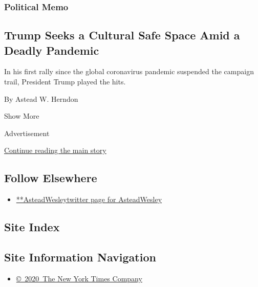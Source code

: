 \begin{enumerate}
  \hypertarget{political-memo}{%
  \subsubsection{Political Memo}\label{political-memo}}

  \hypertarget{trump-seeks-a-cultural-safe-space-amid-a-deadly-pandemic}{%
  \subsection{Trump Seeks a Cultural Safe Space Amid a Deadly
  Pandemic}\label{trump-seeks-a-cultural-safe-space-amid-a-deadly-pandemic}}

  In his first rally since the global coronavirus pandemic suspended the
  campaign trail, President Trump played the hits.

  By Astead W. Herndon
\end{enumerate}

Show More

Advertisement

\protect\hyperlink{after-mid2}{Continue reading the main story}

\hypertarget{follow-elsewhere}{%
\subsection{Follow Elsewhere}\label{follow-elsewhere}}

\begin{itemize}
\tightlist
\item
  \href{https://twitter.com/AsteadWesley}{**AsteadWesleytwitter page for
  AsteadWesley}
\end{itemize}

\hypertarget{site-index}{%
\subsection{Site Index}\label{site-index}}

\hypertarget{site-information-navigation}{%
\subsection{Site Information
Navigation}\label{site-information-navigation}}

\begin{itemize}
\tightlist
\item
  \href{https://help.nytimes3xbfgragh.onion/hc/en-us/articles/115014792127-Copyright-notice}{©~2020~The
  New York Times Company}
\end{itemize}

